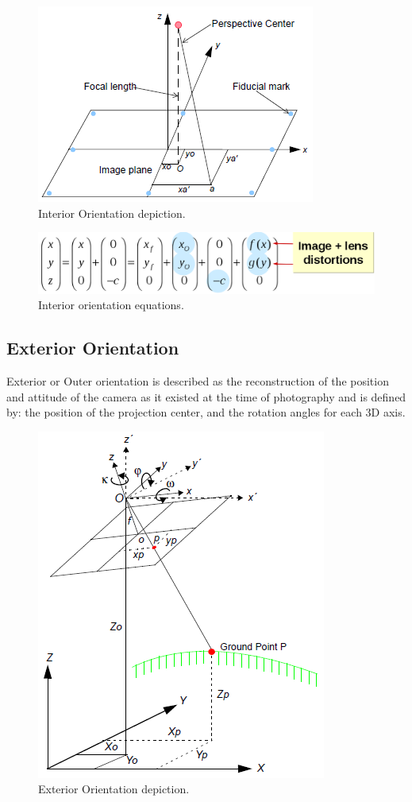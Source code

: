 \documentclass{article}
\begin{document}
\begin{figure}[h!]
\centering
\caption{Interior Orientation depiction.}
\includegraphics{interior_diagram}
\end{figure}

\begin{figure}[h!]
\centering
\caption{Interior orientation equations.}
\includegraphics[scale=0.3]{interior_equations}
\end{figure}

\newpage

\subsection{Exterior Orientation}
Exterior or Outer orientation is described as the reconstruction of the position and attitude of the camera as it existed at the time of
photography and is defined by: the position of the projection center, and the rotation angles for each 3D axis.

\begin{figure}[h!]
\centering
\caption{Exterior Orientation depiction.}
\includegraphics{exterior_diagram}
\end{figure}
\end{document}
